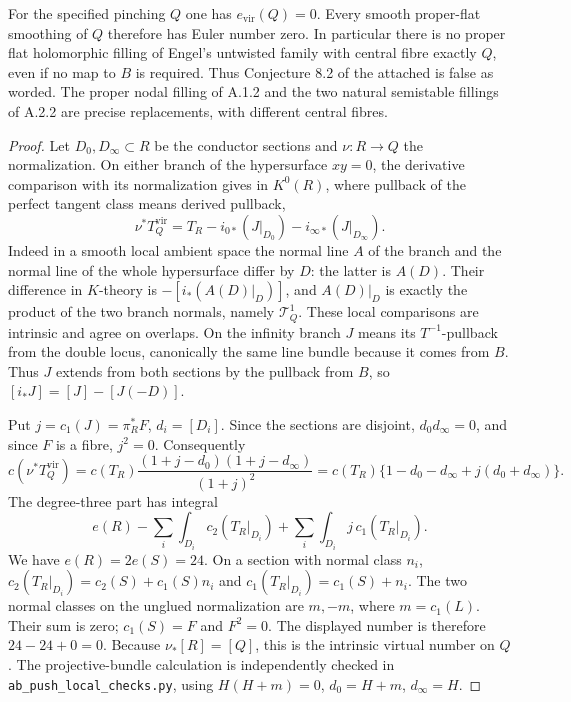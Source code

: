 \begin{theorem}\label{push:src:A.3.2}\label{push:A32}
For the specified pinching $Q$ one has $e_{\mathrm{vir}}(Q)=0$.
Every smooth proper-flat smoothing of $Q$ therefore has Euler
number zero. In particular there is no proper flat holomorphic
filling of Engel's untwisted family with central fibre exactly
$Q$, even if no map to $B$ is required. Thus Conjecture 8.2
of the attached \cite{E26} is false as worded. The proper nodal
filling of A.1.2 and the two natural semistable fillings of
A.2.2 are precise replacements, with different central fibres.
\end{theorem}
\begin{proof}
Let $D_0,D_\infty\subset R$ be the conductor sections and
$\nu:R\to Q$ the normalization. On either branch of the
hypersurface $xy=0$, the derivative comparison with its
normalization gives in $K^0(R)$, where pullback of the
perfect tangent class means derived pullback,
\[
 \nu^*T_Q^{\mathrm{vir}}
 =T_R-i_{0*}(J|_{D_0})-i_{\infty*}(J|_{D_\infty}).
\]
Indeed in a smooth local ambient space the normal line $A$ of
the branch and the normal line of the whole hypersurface
differ by $D$: the latter is $A(D)$. Their difference in
$K$-theory is $-[i_*(A(D)|_D)]$, and $A(D)|_D$ is exactly
the product of the two branch normals, namely $\mathcal T^1_Q$.
These local comparisons are intrinsic and agree on overlaps.
On the infinity branch $J$ means its $T^{-1}$-pullback
from the double locus, canonically the same line bundle
because it comes from $B$. Thus $J$ extends from both sections by the pullback from $B$,
so $[i_*J]=[J]-[J(-D)]$.

Put $j=c_1(J)=\pi_R^*F$, $d_i=[D_i]$. Since the sections are
disjoint, $d_0d_\infty=0$, and since $F$ is a fibre, $j^2=0$.
Consequently
\[
 c(\nu^*T_Q^{\mathrm{vir}})
 =c(T_R)\frac{(1+j-d_0)(1+j-d_\infty)}{(1+j)^2}
 =c(T_R)\{1-d_0-d_\infty+j(d_0+d_\infty)\}.
\]
The degree-three part has integral
\[
 e(R)-\sum_i\int_{D_i}c_2(T_R|_{D_i})
       +\sum_i\int_{D_i}j\,c_1(T_R|_{D_i}).
\]
We have $e(R)=2e(S)=24$. On a section with normal class
$n_i$, $c_2(T_R|_{D_i})=c_2(S)+c_1(S)n_i$ and
$c_1(T_R|_{D_i})=c_1(S)+n_i$. The two normal classes on
the unglued normalization are $m,-m$, where $m=c_1(L)$.
Their sum is zero; $c_1(S)=F$ and $F^2=0$. The displayed
number is therefore $24-24+0=0$. Because
$\nu_*[R]=[Q]$, this is the intrinsic virtual number on $Q$.
The projective-bundle calculation is independently checked
in \texttt{ab\_push\_local\_checks.py}, using
$H(H+m)=0$, $d_0=H+m$, $d_\infty=H$.


\end{proof}
